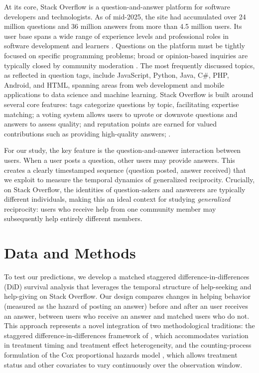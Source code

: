 At its core, Stack Overflow is a question-and-answer platform for software developers and technologists. As of mid-2025, the site had accumulated over 24 million questions and 36 million answers from more than 4.5 million users. Its user base spans a wide range of experience levels and professional roles in software development and learners \citep{stack_overflow_stack_2024}. Questions on the platform must be tightly focused on specific programming problems; broad or opinion-based inquiries are typically closed by community moderation \citep{stack_exchange_inc_how_2024}. The most frequently discussed topics, as reflected in question tags, include JavaScript, Python, Java, C\#, PHP, Android, and HTML, spanning areas from web development and mobile applications to data science and machine learning. Stack Overflow is built around several core features: tags categorize questions by topic, facilitating expertise matching; a voting system allows users to upvote or downvote questions and answers to assess quality; and reputation points are earned for valued contributions such as providing high-quality answers; \citep{stack_exchange_inc_how_2024}.

For our study, the key feature is the question-and-answer interaction between users. When a user posts a question, other users may provide answers. This creates a clearly timestamped sequence (question posted, answer received) that we exploit to measure the temporal dynamics of generalized reciprocity. Crucially, on Stack Overflow, the identities of question-askers and answerers are typically different individuals, making this an ideal context for studying \textit{generalized} reciprocity: users who receive help from one community member may subsequently help entirely different members.

\section{Data and Methods}
\label{sec:methods}

To test our predictions, we develop a matched staggered difference-in-differences (DiD) survival analysis that leverages the temporal structure of help-seeking and help-giving on Stack Overflow. Our design compares changes in helping behavior (measured as the hazard of posting an answer) before and after an user receives an answer, between users who receive an answer and matched users who do not. This approach represents a novel integration of two methodological traditions: the staggered difference-in-differences framework of \citet{callaway_santanna_2021}, which accommodates variation in treatment timing and treatment effect heterogeneity, and the counting-process formulation of the Cox proportional hazards model \citep{andersen_gill_1982}, which allows treatment status and other covariates to vary continuously over the observation window.

